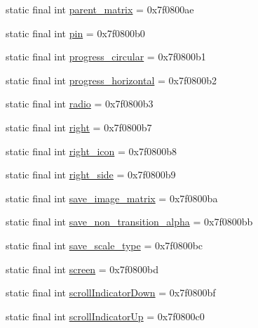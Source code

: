 \begin{DoxyCompactItemize}
\item 
static final int \mbox{\hyperlink{classandroid_1_1support_1_1design_1_1_r_1_1id_a2bd745f280249f388515643ee6c1a821}{parent\+\_\+matrix}} = 0x7f0800ae
\item 
static final int \mbox{\hyperlink{classandroid_1_1support_1_1design_1_1_r_1_1id_a64b02d83c7966402e2d4731279fc4459}{pin}} = 0x7f0800b0
\item 
static final int \mbox{\hyperlink{classandroid_1_1support_1_1design_1_1_r_1_1id_a24bfc1b1443d3b08a28b08402fcfae13}{progress\+\_\+circular}} = 0x7f0800b1
\item 
static final int \mbox{\hyperlink{classandroid_1_1support_1_1design_1_1_r_1_1id_a0ab595e62dd9b749124e5adb812fa736}{progress\+\_\+horizontal}} = 0x7f0800b2
\item 
static final int \mbox{\hyperlink{classandroid_1_1support_1_1design_1_1_r_1_1id_a97840ad47561a6d255ff054ba4e9920d}{radio}} = 0x7f0800b3
\item 
static final int \mbox{\hyperlink{classandroid_1_1support_1_1design_1_1_r_1_1id_a6d2ecb72c1c1c7e0da0f1b2b7d153e30}{right}} = 0x7f0800b7
\item 
static final int \mbox{\hyperlink{classandroid_1_1support_1_1design_1_1_r_1_1id_a54c6b12bf337a93aab8931cea42f9775}{right\+\_\+icon}} = 0x7f0800b8
\item 
static final int \mbox{\hyperlink{classandroid_1_1support_1_1design_1_1_r_1_1id_a93836db3949e044a6dfbad64ae62cab7}{right\+\_\+side}} = 0x7f0800b9
\item 
static final int \mbox{\hyperlink{classandroid_1_1support_1_1design_1_1_r_1_1id_a58cd069e576aa4d3eda461492763756f}{save\+\_\+image\+\_\+matrix}} = 0x7f0800ba
\item 
static final int \mbox{\hyperlink{classandroid_1_1support_1_1design_1_1_r_1_1id_a9480978f499efdfd69d36cd24da62e87}{save\+\_\+non\+\_\+transition\+\_\+alpha}} = 0x7f0800bb
\item 
static final int \mbox{\hyperlink{classandroid_1_1support_1_1design_1_1_r_1_1id_a343189d588551626c780b1569d7c03c3}{save\+\_\+scale\+\_\+type}} = 0x7f0800bc
\item 
static final int \mbox{\hyperlink{classandroid_1_1support_1_1design_1_1_r_1_1id_a613b55667004b367557c603b0c685f13}{screen}} = 0x7f0800bd
\item 
static final int \mbox{\hyperlink{classandroid_1_1support_1_1design_1_1_r_1_1id_a17784d8de2698de349a8c79f628577a1}{scroll\+Indicator\+Down}} = 0x7f0800bf
\item 
static final int \mbox{\hyperlink{classandroid_1_1support_1_1design_1_1_r_1_1id_a9e01295deb3b05381329d91aad8489a4}{scroll\+Indicator\+Up}} = 0x7f0800c0

\end{DoxyCompactItemize}
